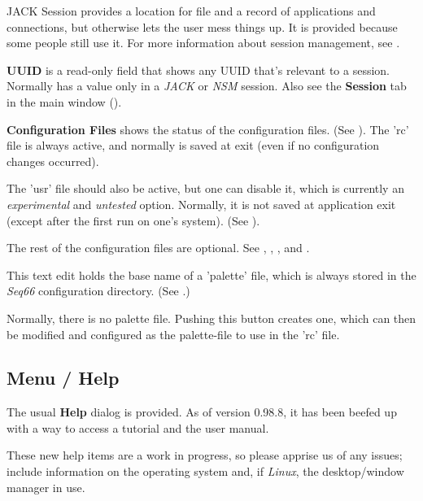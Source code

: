    JACK Session provides a location for file and a record of applications and
   connections, but otherwise lets the user mess things up.  It is
   provided because some people still use it.
   For more information about session management, see
   .

   \textbf{UUID} is a read-only field that shows any UUID that's relevant to a
   session. Normally has a value only in a \textsl{JACK} or
   \textsl{NSM} session.
   Also see the \textbf{Session} tab in the main window
   ().

   \textbf{Configuration Files}
   shows the status of the configuration files.
   (See ).
   The 'rc' file is always active, and normally is saved at exit (even if no
   configuration changes occurred).

   The 'usr' file should also be active, but one can disable it, which is
   currently an \textsl{experimental} and \textsl{untested} option.
   Normally, it is not saved at application exit (except after the first run on
   one's system).
   (See ).

   The rest of the configuration files are optional.
   See
   ,
   ,
   , and
   .

   This text edit holds the base name of a 'palette' file, which is always
   stored in the \textsl{Seq66} configuration directory.
   (See .)

   Normally, there is no palette file.  Pushing this button creates one, which
   can then be modified and configured as the palette-file to use in the 'rc'
   file.

\subsection{Menu / Help}
\label{subsec:menu_help}

   The usual \textbf{Help} dialog is provided.
   As of version 0.98.8, it has been beefed up with a way to access a
   tutorial and the user manual.

   These new help items are a work in progress, so please apprise
   us of any issues; include information on the operating system and,
   if \textsl{Linux}, the desktop/window manager in use.


